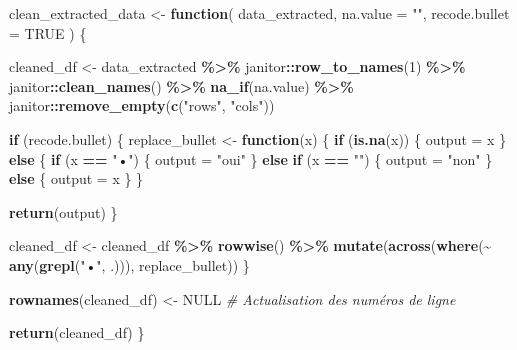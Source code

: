 \documentclass[
  french,
]{book}
\newenvironment{Shaded}{\begin{snugshade}}{\end{snugshade}}
\newcommand{\CommentTok}[1]{\textcolor[rgb]{0.56,0.35,0.01}{\textit{#1}}}
\newcommand{\ControlFlowTok}[1]{\textcolor[rgb]{0.13,0.29,0.53}{\textbf{#1}}}
\newcommand{\DataTypeTok}[1]{\textcolor[rgb]{0.13,0.29,0.53}{#1}}
\newcommand{\DecValTok}[1]{\textcolor[rgb]{0.00,0.00,0.81}{#1}}
\newcommand{\KeywordTok}[1]{\textcolor[rgb]{0.13,0.29,0.53}{\textbf{#1}}}
\newcommand{\NormalTok}[1]{#1}
\newcommand{\OperatorTok}[1]{\textcolor[rgb]{0.81,0.36,0.00}{\textbf{#1}}}
\newcommand{\OtherTok}[1]{\textcolor[rgb]{0.56,0.35,0.01}{#1}}
\newcommand{\StringTok}[1]{\textcolor[rgb]{0.31,0.60,0.02}{#1}}
\begin{document}
\begin{Shaded}
\begin{Highlighting}[]
\NormalTok{clean\_extracted\_data \textless{}{-}}\StringTok{ }\ControlFlowTok{function}\NormalTok{(}
\NormalTok{  data\_extracted,}
  \DataTypeTok{na.value =} \StringTok{""}\NormalTok{, }
  \DataTypeTok{recode.bullet =} \OtherTok{TRUE}
\NormalTok{) \{}
  
\NormalTok{  cleaned\_df \textless{}{-}}\StringTok{ }\NormalTok{data\_extracted }\OperatorTok{\%\textgreater{}\%}
\StringTok{    }\NormalTok{janitor}\OperatorTok{::}\KeywordTok{row\_to\_names}\NormalTok{(}\DecValTok{1}\NormalTok{) }\OperatorTok{\%\textgreater{}\%}
\StringTok{    }\NormalTok{janitor}\OperatorTok{::}\KeywordTok{clean\_names}\NormalTok{() }\OperatorTok{\%\textgreater{}\%}
\StringTok{    }\KeywordTok{na\_if}\NormalTok{(na.value) }\OperatorTok{\%\textgreater{}\%}
\StringTok{    }\NormalTok{janitor}\OperatorTok{::}\KeywordTok{remove\_empty}\NormalTok{(}\KeywordTok{c}\NormalTok{(}\StringTok{"rows"}\NormalTok{, }\StringTok{"cols"}\NormalTok{))}
  
  \ControlFlowTok{if}\NormalTok{ (recode.bullet) \{}
\NormalTok{    replace\_bullet \textless{}{-}}\StringTok{ }\ControlFlowTok{function}\NormalTok{(x) \{}
      \ControlFlowTok{if}\NormalTok{ (}\KeywordTok{is.na}\NormalTok{(x)) \{}
\NormalTok{        output =}\StringTok{ }\NormalTok{x}
\NormalTok{      \} }\ControlFlowTok{else}\NormalTok{ \{}
        \ControlFlowTok{if}\NormalTok{ (x }\OperatorTok{==}\StringTok{ "•"}\NormalTok{) \{}
\NormalTok{          output =}\StringTok{ "oui"}
\NormalTok{        \} }\ControlFlowTok{else} \ControlFlowTok{if}\NormalTok{ (x }\OperatorTok{==}\StringTok{ ""}\NormalTok{) \{}
\NormalTok{          output =}\StringTok{ "non"}
\NormalTok{        \} }\ControlFlowTok{else}\NormalTok{ \{}
\NormalTok{          output =}\StringTok{ }\NormalTok{x}
\NormalTok{        \}}
\NormalTok{      \}}
      
      \KeywordTok{return}\NormalTok{(output)}
\NormalTok{    \}}
    
\NormalTok{    cleaned\_df \textless{}{-}}\StringTok{ }\NormalTok{cleaned\_df }\OperatorTok{\%\textgreater{}\%}
\StringTok{      }\KeywordTok{rowwise}\NormalTok{() }\OperatorTok{\%\textgreater{}\%}
\StringTok{      }\KeywordTok{mutate}\NormalTok{(}\KeywordTok{across}\NormalTok{(}\KeywordTok{where}\NormalTok{(}\OperatorTok{\textasciitilde{}}\StringTok{ }\KeywordTok{any}\NormalTok{(}\KeywordTok{grepl}\NormalTok{(}\StringTok{"•"}\NormalTok{, .))), replace\_bullet))}
\NormalTok{  \}}
  
  \KeywordTok{rownames}\NormalTok{(cleaned\_df) \textless{}{-}}\StringTok{ }\OtherTok{NULL} \CommentTok{\# Actualisation des numéros de ligne}
  
  \KeywordTok{return}\NormalTok{(cleaned\_df)}
\NormalTok{\}}
\end{Highlighting}
\end{Shaded}
\end{document}
